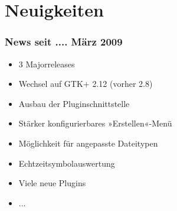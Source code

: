 \section{Neuigkeiten}
\begin{frame}
	\frametitle{News seit .... März 2009}
	\begin{block}{}
		\begin{itemize}
			\item 3 Majorreleases
			\item Wechsel auf GTK+ 2.12 (vorher 2.8)
			\item Ausbau der Pluginschnittstelle
			\item Stärker konfigurierbares »Erstellen«-Menü
			\item Möglichkeit für angepasste Dateitypen
			\item Echtzeitsymbolauswertung
			\item Viele neue Plugins
			\item ...
		\end{itemize}
	\end{block}
\end{frame}
